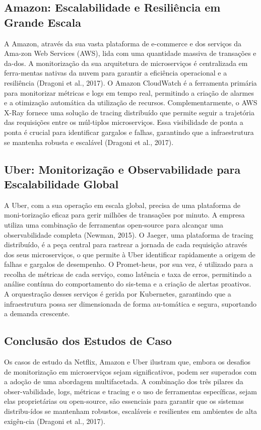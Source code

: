 \subsection{Amazon: Escalabilidade e Resiliência em Grande Escala}

A Amazon, através da sua vasta plataforma de e-commerce e dos serviços da Ama-zon Web Services (AWS), lida com uma quantidade massiva de transações e da-dos. A monitorização da sua arquitetura de microserviços é centralizada em ferra-mentas nativas da nuvem para garantir a eficiência operacional e a resiliência (Dragoni et al., 2017).
O Amazon CloudWatch é a ferramenta primária para monitorizar métricas e logs em tempo real, permitindo a criação de alarmes e a otimização automática da utilização de recursos. Complementarmente, o AWS X-Ray fornece uma solução de tracing distribuído que permite seguir a trajetória das requisições entre os múl-tiplos microserviços. Essa visibilidade de ponta a ponta é crucial para identificar gargalos e falhas, garantindo que a infraestrutura se mantenha robusta e escalável (Dragoni et al., 2017).

\subsection{Uber: Monitorização e Observabilidade para Escalabilidade Global}

A Uber, com a sua operação em escala global, precisa de uma plataforma de moni-torização eficaz para gerir milhões de transações por minuto. A empresa utiliza uma combinação de ferramentas open-source para alcançar uma observabilidade completa (Newman, 2015).
O Jaeger, uma plataforma de tracing distribuído, é a peça central para rastrear a jornada de cada requisição através dos seus microserviços, o que permite à Uber identificar rapidamente a origem de falhas e gargalos de desempenho. O Promet-heus, por sua vez, é utilizado para a recolha de métricas de cada serviço, como latência e taxa de erros, permitindo a análise contínua do comportamento do sis-tema e a criação de alertas proativos. A orquestração desses serviços é gerida por Kubernetes, garantindo que a infraestrutura possa ser dimensionada de forma au-tomática e segura, suportando a demanda crescente.

\subsection{Conclusão dos Estudos de Caso}

Os casos de estudo da Netflix, Amazon e Uber ilustram que, embora os desafios de monitorização em microserviços sejam significativos, podem ser superados com a adoção de uma abordagem multifacetada. A combinação dos três pilares da obser-vabilidade, logs, métricas e tracing e o uso de ferramentas específicas, sejam elas proprietárias ou open-source, são essenciais para garantir que os sistemas distribu-ídos se mantenham robustos, escaláveis e resilientes em ambientes de alta exigên-cia (Dragoni et al., 2017).

